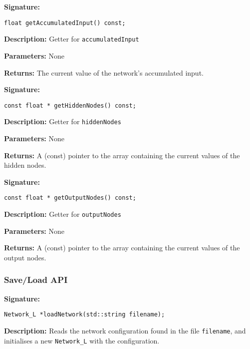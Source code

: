\documentclass[a4paper]{article}
\begin{document}
\textbf{Signature:} \begin{lstlisting}
float getAccumulatedInput() const;
\end{lstlisting}

\textbf{Description: }
Getter for \lstinline{accumulatedInput}

\textbf{Parameters: } None

\textbf{Returns: }
The current value of the network's accumulated input.

\hrulefill %

\textbf{Signature:} \begin{lstlisting}
const float * getHiddenNodes() const;
\end{lstlisting}

\textbf{Description: }
Getter for \lstinline{hiddenNodes}

\textbf{Parameters: } None

\textbf{Returns: }
A (const) pointer to the array containing the current values of the hidden nodes.

\hrulefill %

\textbf{Signature:} \begin{lstlisting}
const float * getOutputNodes() const;
\end{lstlisting}

\textbf{Description: }
Getter for \lstinline{outputNodes}

\textbf{Parameters: } None

\textbf{Returns: }
A (const) pointer to the array containing the current values of the output nodes.

\hrulefill %

\subsubsection{Save/Load API}%

\hrulefill %

\textbf{Signature:} \begin{lstlisting}
Network_L *loadNetwork(std::string filename);
\end{lstlisting}

\textbf{Description: }
Reads the network configuration found in the file \lstinline{filename}, and initialises a new \lstinline{Network_L} with the configuration.
\end{document}
